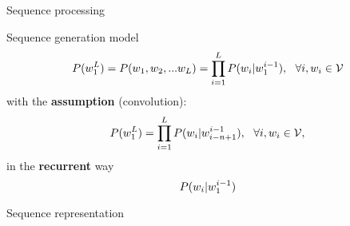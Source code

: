 
\newcommand{\largeur}{0.5}
\newcommand{\hauteur}{1.5}
\newcommand{\rayon}{0.075cm}
\newcommand{\ytext}{-1}
\newcommand{\ytexth}{3*\hauteur+2.5}
\newcommand{\dlayer}[3]{ \draw[fill=#3] (#1,#2) rectangle (#1+\largeur,#2+\hauteur); %
  \foreach \y in {0.25,0.5,...,1.25}{ \draw[fill=black] (#1+\largeur/2,#2+\y) circle (\rayon);};%
}
\newcommand{\greenhc}{\color{green!50!black}}
\newcommand{\hiddenl}{\greenhc\seq{h}_t}



\begin{frame}{Sequence processing}
  \begin{block}{Sequence generation model}
    $$
    P({{w}_{1}^{L}}) = P({w}_1, {w}_2, ... {w}_L) = \prod_{i=1}^L P({w}_i | {{w}_{1}^{i-1}}),\ \ \forall i , {w}_i \in {\mathcal{V}}
    $$
    with the \textbf{\ngram assumption} (convolution):
    $$
    P({{w}_{1}^{L}}) = \prod_{i=1}^L P({w}_i | {{w}_{i-n+1}^{i-1}}),\ \ \forall i , {w}_i \in {\mathcal{V}},
    $$
    in the \textbf{recurrent} way 
    $$ P({w}_i | {{w}_{1}^{i-1}})$$
  \end{block}
  \begin{block}{Sequence representation}
    \begin{center}
    \end{center}
  \end{block}
\end{frame}

